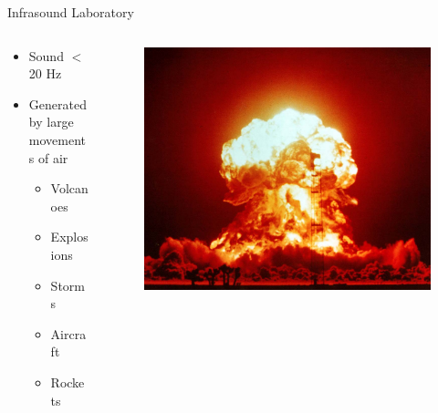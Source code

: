 \documentclass{beamer}
\begin{document}
\begin{frame}{Infrasound Laboratory}
\begin{columns}
	\begin{column}{.60\textwidth}
		\begin{itemize}
			\item Sound $<$20 Hz
			\item Generated by large movements of air
			\begin{itemize}
				\item Volcanoes
				\item Explosions
				\item Storms
				\item Aircraft
				\item Rockets
			\end{itemize}
		\end{itemize}
	\end{column}
	\begin{column}{.40\textwidth}
		\begin{figure}
			\includegraphics[width=\linewidth]{img/nuke.jpg}
		\end{figure}
	\end{column}
\end{columns}
\end{frame}
\end{document}

